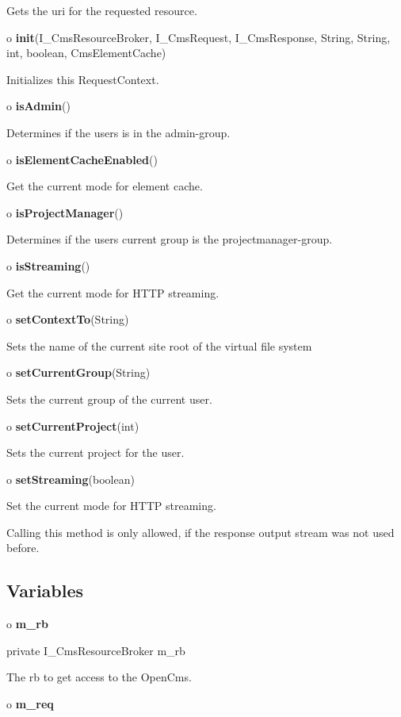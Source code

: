 \begin{description}
Gets the uri for the requested resource.  
\item o {\bf init}(I\_CmsResourceBroker, I\_CmsRequest, I\_CmsResponse,
String, String, int, boolean, CmsElementCache)  

Initializes this RequestContext.  
\item o {\bf isAdmin}()  

Determines if the users is in the admin-group.  
\item o {\bf isElementCacheEnabled}()  

Get the current mode for element cache.  
\item o {\bf isProjectManager}()  

Determines if the users current group is the projectmanager-group.  
\item o {\bf isStreaming}()  

Get the current mode for HTTP streaming.  
\item o {\bf setContextTo}(String)  

Sets the name of the current site root of the virtual file system  
\item o {\bf setCurrentGroup}(String)  

Sets the current group of the current user.  
\item o {\bf setCurrentProject}(int)  

Sets the current project for the user.  
\item o {\bf setStreaming}(boolean)  

Set the current mode for HTTP streaming.

Calling this method is only allowed, if the response output stream was not
used before. 
\end{description}

\subsection*{  Variables }

o {\bf m\_rb} 

\begin{PRE}
 private I\_CmsResourceBroker m\_rb
\end{PRE}

\begin{description}
\htmlDD The rb to get access to the OpenCms.

\end{description}

o {\bf m\_req} 

